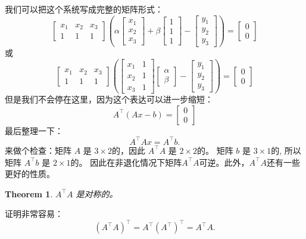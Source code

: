 \documentclass[notitlepage,oneside]{book}
\newtheorem{theorem}{Theorem}
\begin{document}
我们可以把这个系统写成完整的矩阵形式：
$$
\begin{bmatrix}x_1 & x_2 & x_3 \\ 1 & 1 & 1 \end{bmatrix}
\left(\alpha \begin{bmatrix}x_1  \\ x_2 \\x_3  \end{bmatrix}
+\beta \begin{bmatrix}1 \\ 1 \\1 \end{bmatrix} - 
\begin{bmatrix}y_1\\y_2\\y_3\end{bmatrix}\right) = \begin{bmatrix}0\\0\end{bmatrix}
$$
或
$$
\begin{bmatrix}x_1 & x_2 & x_3 \\ 1 & 1 & 1 \end{bmatrix}
\left(
\begin{bmatrix}x_1  & 1 \\ x_2 & 1 \\x_3 & 1 \end{bmatrix}
\begin{bmatrix} \alpha \\ \beta \end{bmatrix}-
\begin{bmatrix} y_1 \\ y_2 \\ y_3 \end{bmatrix}
\right) = \begin{bmatrix}0\\0\end{bmatrix}
$$
但是我们不会停在这里，因为这个表达可以进一步缩短：
$$
A^\top (Ax - b)= \begin{bmatrix}0\\0\end{bmatrix}
$$
最后整理一下：
$$
A^\top Ax = A^\top b.
$$
来做个检查：矩阵 $A$ 是 $3\times 2$的，因此  $A^\top A$ 是 $2\times 2$的。 矩阵 $b$ 是 $3\times 1$的, 所以矩阵 $A^\top b$ 是 $2\times 1$的。
因此在非退化情况下矩阵$A^\top A$可逆。此外，$A^\top A$还有一些更好的性质。


\begin{theorem}
$A^\top A$ 是对称的。
\end{theorem}
证明非常容易：
$$
(A^\top A)^\top = A^\top (A^\top)^\top = A^\top A.
$$
\end{document}
